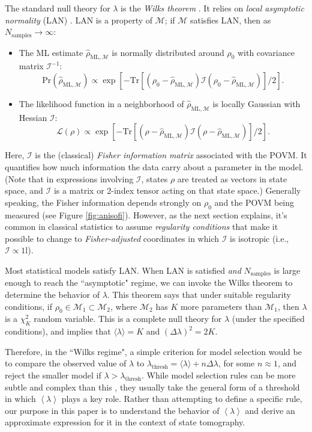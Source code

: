 \documentclass[aps,pra, twocolumn]{revtex4-1}
\newcommand{\M}{\mathcal{M}}
\newcommand{\Id}{\mathbb{I}}
\newcommand{\expect}[1]{\ensuremath{\left\langle#1\right\rangle}}
\def\Id{1\!\mathrm{l}}
\newcommand{\Fi}{\mathcal{I}}
\newcommand{\rhohat}{\hat{\rho}}
\newcommand{\rhoML}[1]{\rhohat_{\scriptscriptstyle{\mathrm{ML},#1}}}
\begin{document}
The standard null theory for $\lambda$ is the \emph{Wilks theorem} \cite{Wilks1938}. It relies on \emph{local asymptotic normality} (LAN) \cite{LeCam1970, LeCam1956}. LAN is a property of $\M$; if $\M$ satisfies LAN, then as $N_{\mathrm{samples}}\rightarrow \infty$:
\begin{itemize}[nosep]
\item The ML estimate $\rhoML{\M}$ is normally distributed around $\rho_{0}$ with covariance matrix $\Fi^{-1}$:
\begin{equation}
\label{eq:landist}
\mathrm{Pr}(\rhoML{\M}) \propto \exp\left[-\mathrm{Tr}[(\rho_{0} - \rhoML{\M})\mathcal{I}(\rho_{0} -\rhoML{\M})]/2\right].
\end{equation}
\item The likelihood function in a neighborhood of $\rhoML{\M}$ is locally Gaussian with Hessian $\Fi$:
\begin{equation}
\label{eq:lanl}
\mathcal{L}(\rho) \propto \exp\left[-\mathrm{Tr}[(\rho - \rhoML{\M})\mathcal{I}(\rho - \rhoML{\M})]/2\right].
\end{equation}
\end{itemize}
Here, $\Fi$ is the (classical) \emph{Fisher information matrix} associated with the POVM. It quantifies how much information the data carry about a parameter in the model.  (Note that in expressions involving $\mathcal{I}$, states $\rho$ are treated as vectors in state space, and $\mathcal{I}$ is a matrix or 2-index tensor acting on that state space.) Generally speaking, the Fisher information depends strongly on $\rho_{0}$ and the POVM being measured (see Figure \ref{fig:anisofi}). However, as the next section explains, it's common in classical statistics to assume \emph{regularity conditions} that make it possible to change to \emph{Fisher-adjusted} coordinates in which $\mathcal{I}$ is isotropic (i.e., $\mathcal{I} \propto \Id$).

Most statistical models satisfy LAN.  When LAN is satisfied \emph{and} $N_{\mathrm{samples}}$ is large enough to reach the ``asymptotic" regime, we can invoke the Wilks theorem to determine the behavior of $\lambda$. This theorem says that under suitable regularity conditions, if $\rho_{0}\in \M_{1}\subset \M_{2}$, where $\M_{2}$ has $K$ more parameters than $\M_{1}$, then $\lambda$ is a $\chi^{2}_{K}$ random variable.  This is a complete null theory for $\lambda$ (under the specified conditions), and implies that $\langle \lambda \rangle = K$ and $(\Delta \lambda)^{2} = 2K$.

Therefore, in the ``Wilks regime", a simple criterion for model selection would be to compare the observed value of $\lambda$ to $\lambda_{\mathrm{thresh}} = \langle \lambda \rangle + n\Delta \lambda$, for some $n \approx 1$, and reject the smaller model if $\lambda > \lambda_{\mathrm{thresh}}$.  While model selection rules can be more subtle and complex than this \cite{Akaike1974, Schwarz1978, Kass1995, Spiegelhalter2002}, they usually take the general form of a threshold in which $\expect{\lambda}$ plays a key role.  Rather than attempting to define a specific rule, our purpose in this paper is to understand the behavior of $\expect{\lambda}$ and derive an approximate expression for it in the context of state tomography.
\end{document}

